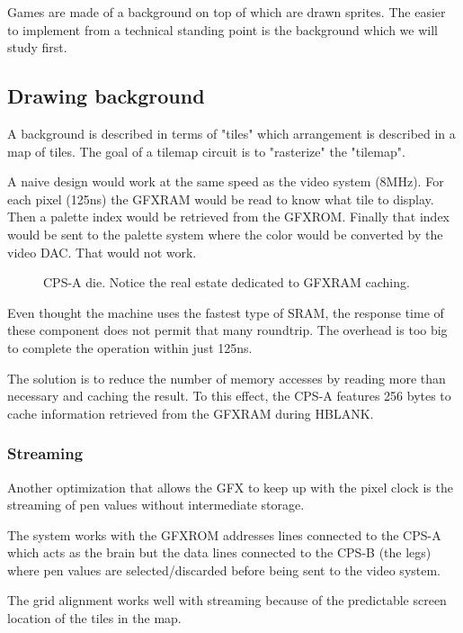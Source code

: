 Games are made of a background on top of which are drawn sprites. The easier to implement from a technical standing point is the background which we will study first.

\subsection{Drawing background}

A background is described in terms of "tiles" which arrangement is described in a map of tiles. The goal of a tilemap circuit is to "rasterize" the "tilemap".

A naive design would work at the same speed as the video system (8MHz). For each pixel (125ns) the GFXRAM would be read to know what tile to display. Then a palette index would be retrieved from the GFXROM. Finally that index would be sent to the palette system where the color would be converted by the video DAC. That would not work.

 \begin{figure}[H]%
 \caption*{CPS-A die. Notice the real estate dedicated to GFXRAM caching.}%
 \end{figure}%

Even thought the machine uses the fastest type of SRAM, the response time of these component does not permit that many roundtrip. The overhead is too big to complete the operation within just 125ns.

The solution is to reduce the number of memory accesses by reading more than necessary and caching the result. To this effect, the CPS-A features 256 bytes to cache information retrieved from the GFXRAM during HBLANK.




\subsubsection{Streaming}
Another optimization that allows the GFX to keep up with the pixel clock is the streaming of pen values without intermediate storage. 

The system works with the GFXROM addresses lines connected to the CPS-A which acts as the brain but the data lines  connected to the CPS-B (the legs) where pen values are selected/discarded before being sent to the video system.

The grid alignment works well with streaming because of the predictable screen location of the tiles in the map.

